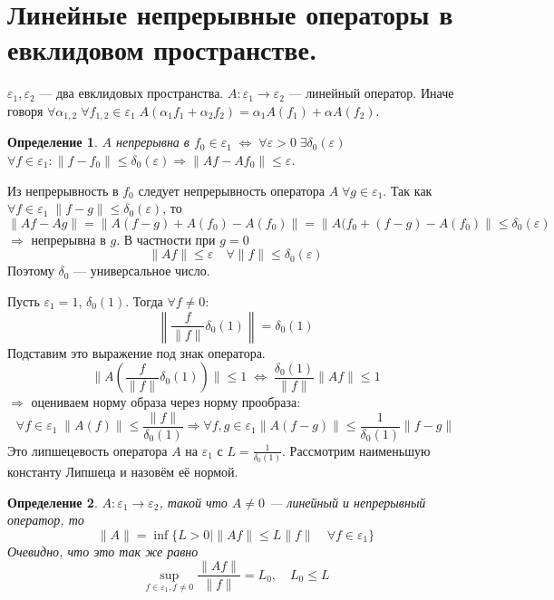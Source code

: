 \documentclass[12pt]{article}
\begin{document}
\section*{Линейные непрерывные операторы в евклидовом пространстве.}
\newtheorem{Theor}{Теорема}
\newtheorem{Opr}{Определение}
\newtheorem{Upr}{Упражнение}
\newtheorem{Nabl}{Наблюдение}
\newtheorem{Zam}{Замечание}

$\varepsilon_1, \varepsilon_2$ --- два евклидовых пространства.
$A : \varepsilon_1 \to \varepsilon_2$ --- линейный оператор.
Иначе говоря $\forall \alpha_{1, 2}\; \forall f_{1, 2} \in \varepsilon_1\; A(\alpha_1 f_1 + \alpha_2 f_2) = \alpha_1 A(f_1) + \alpha A(f_2)$.

\begin{Opr}
    $A$ непрерывна в $f_0 \in \varepsilon_1\; \Leftrightarrow\; \forall \varepsilon > 0\; \exists \delta_0(\varepsilon)$
    $\forall f \in \varepsilon_1\colon \|f - f_0\| \le \delta_0(\varepsilon) \Rightarrow  \|Af-Af_0\| \le \varepsilon$.
\end{Opr}

Из непрерывность в $f_0$ следует непрерывность оператора $A\; \forall g \in \varepsilon_1$.
Так как $\forall f \in \varepsilon_1\; \|f - g\| \le \delta_0(\varepsilon)$, то 
$$
\|Af - Ag\| = \|A(f - g) + A(f_0) - A(f_0)\| = \|A(f_0 + (f - g)
- A(f_0)\| \le \delta_0(\varepsilon)
$$
$\Rightarrow$ непрерывна в $g$.
В частности при $g = 0$
$$
\|Af\| \le \varepsilon\quad \forall \|f\| \le \delta_0(\varepsilon)
$$
Поэтому $\delta_0$ --- универсальное число.

Пусть $\varepsilon_1 = 1$, $\delta_0(1)$.
Тогда $\forall f \ne 0$:
$$
\left \| \frac{f}{\|f\|}\delta_0(1)\right \| = \delta_0(1)
$$
Подставим это выражение под знак оператора.
$$
\|A(\frac{f}{\|f\|}\delta_0(1))\| \le 1\; \Leftrightarrow\; \frac{\delta_0(1)}{\|f\|}\|Af\| \le 1
$$
$\Rightarrow$ оцениваем норму образа через норму
прообраза:
$$
\forall f \in \varepsilon_1\; \|A(f)\| \le \frac{\|f\|}{\delta_0(1)} \Rightarrow  \forall f,g \in \varepsilon_1 \|A(f-g)\| \le \frac{1}{\delta_0(1)}\|f - g\|
$$
Это липшецевость оператора $A$ на $\varepsilon_1$ с $L=\frac{1}{\delta_0(1)}$.
Рассмотрим наименьшую константу Липшеца и назовём её нормой.


\begin{Opr}
    $A : \varepsilon_1 \to \varepsilon_2$, такой что $A \ne 0$ --- линейный и непрерывный оператор, то
    $$
    \|A\| = \inf\{L > 0 \mid \|Af\| \le L\|f\| \quad \forall f \in \varepsilon_1\}
    $$
    Очевидно, что это так же равно
    $$
    \sup\limits_{f \in \varepsilon_1, f \ne 0} \frac {\|Af\|}{\|f\|}=L_0,\quad L_0 \le L
    $$
\end{Opr}
\end{document}
